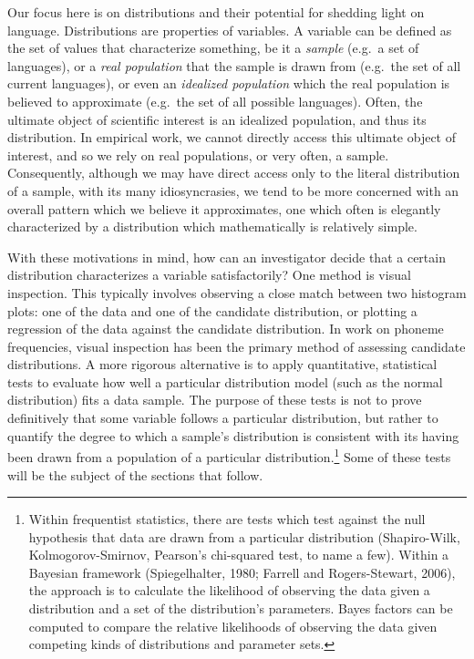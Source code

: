 Our focus here is on distributions and their potential for shedding light on language. Distributions are properties of variables. A variable can be defined as the set of values that characterize something, be it a \emph{sample} (e.g.~a set of languages), or a \emph{real population} that the sample is drawn from (e.g.~the set of all current languages), or even an \emph{idealized population} which the real population is believed to approximate (e.g.~the set of all possible languages). Often, the ultimate object of scientific interest is an idealized population, and thus its distribution. In empirical work, we cannot directly access this ultimate object of interest, and so we rely on real populations, or very often, a sample. Consequently, although we may have direct access only to the literal distribution of a sample, with its many idiosyncrasies, we tend to be more concerned with an overall pattern which we believe it approximates, one which often is elegantly characterized by a distribution which mathematically is relatively simple.

With these motivations in mind, how can an investigator decide that a certain distribution characterizes a variable satisfactorily? One method is visual inspection. This typically involves observing a close match between two histogram plots: one of the data and one of the candidate distribution, or plotting a regression of the data against the candidate distribution. In work on phoneme frequencies, visual inspection has been the primary method of assessing candidate distributions. A more rigorous alternative is to apply quantitative, statistical tests to evaluate how well a particular distribution model (such as the normal distribution) fits a data sample. The purpose of these tests is not to prove definitively that some variable follows a particular distribution, but rather to quantify the degree to which a sample's distribution is consistent with its having been drawn from a population of a particular distribution.\footnote{Within frequentist statistics, there are tests which test against the null hypothesis that data are drawn from a particular distribution (Shapiro-Wilk, Kolmogorov-Smirnov, Pearson's chi-squared test, to name a few). Within a Bayesian framework (Spiegelhalter, 1980; Farrell and Rogers-Stewart, 2006), the approach is to calculate the likelihood of observing the data given a distribution and a set of the distribution's parameters. Bayes factors can be computed to compare the relative likelihoods of observing the data given competing kinds of distributions and parameter sets.} Some of these tests will be the subject of the sections that follow.

